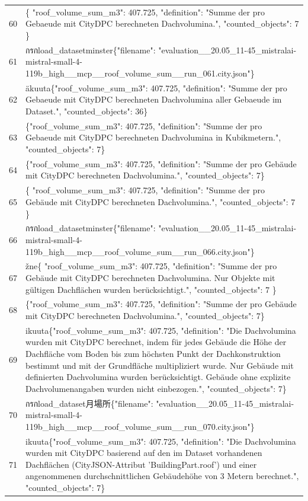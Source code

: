 \documentclass[a4paper,11pt]{article}
\begin{document}
\begin{table}[ht]
\begin{tabular}{r p{12cm}}
60 & \{
  "roof\_volume\_sum\_m3": 407.725,
  "definition": "Summe der pro Gebaeude mit CityDPC berechneten Dachvolumina.",
  "counted\_objects": 7
\} \\
61 &  กรกload\_datasetminster\{"filename": "evaluation\_\_20.05\_11-45\_mistralai-mistral-small-4-119b\_high\_\_mcp\_\_roof\_volume\_sum\_\_run\_061.city.json"\} \\
62 & äkuuta\{"roof\_volume\_sum\_m3": 407.725, "definition": "Summe der pro Gebaeude mit CityDPC berechneten Dachvolumina aller Gebaeude im Dataset.", "counted\_objects": 36\} \\
63 & \{"roof\_volume\_sum\_m3": 407.725, "definition": "Summe der pro Gebaeude mit CityDPC berechneten Dachvolumina in Kubikmetern.", "counted\_objects": 7\} \\
64 & \{"roof\_volume\_sum\_m3": 407.725, "definition": "Summe der pro Gebäude mit CityDPC berechneten Dachvolumina.", "counted\_objects": 7\} \\
65 & \{
  "roof\_volume\_sum\_m3": 407.725,
  "definition": "Summe der pro Gebäude mit CityDPC berechneten Dachvolumina.",
  "counted\_objects": 7
\} \\
66 &  กรกload\_datasetminster\{"filename": "evaluation\_\_20.05\_11-45\_mistralai-mistral-small-4-119b\_high\_\_mcp\_\_roof\_volume\_sum\_\_run\_066.city.json"\} \\
67 & žne\{
  "roof\_volume\_sum\_m3": 407.725,
  "definition": "Summe der pro Gebäude mit CityDPC berechneten Dachvolumina. Nur Objekte mit gültigen Dachflächen wurden berücksichtigt.",
  "counted\_objects": 7
\} \\
68 & \{"roof\_volume\_sum\_m3": 407.725, "definition": "Summe der pro Gebäude mit CityDPC berechneten Dachvolumina.", "counted\_objects": 7\} \\
69 & ikuuta\{"roof\_volume\_sum\_m3": 407.725, "definition": "Die Dachvolumina wurden mit CityDPC berechnet, indem für jedes Gebäude die Höhe der Dachfläche vom Boden bis zum höchsten Punkt der Dachkonstruktion bestimmt und mit der Grundfläche multipliziert wurde. Nur Gebäude mit definierten Dachvolumina wurden berücksichtigt. Gebäude ohne explizite Dachvolumenangaben wurden nicht einbezogen.", "counted\_objects": 7\} \\
70 &  กรกload\_dataset月場所\{"filename": "evaluation\_\_20.05\_11-45\_mistralai-mistral-small-4-119b\_high\_\_mcp\_\_roof\_volume\_sum\_\_run\_070.city.json"\} \\
71 & ikuuta\{"roof\_volume\_sum\_m3": 407.725, "definition": "Die Dachvolumina wurden mit CityDPC basierend auf den im Dataset vorhandenen Dachflächen (CityJSON-Attribut 'BuildingPart.roof') und einer angenommenen durchschnittlichen Gebäudehöhe von 3 Metern berechnet.", "counted\_objects": 7\} \\

\end{tabular}
\end{table}
\end{document}
